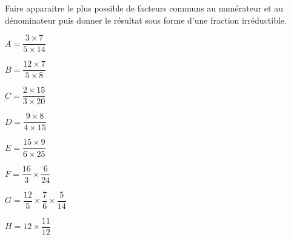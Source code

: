 \begin{exercice*}
    Faire apparaitre le plus possible de facteurs communs au numérateur et au dénominateur puis donner le résultat sous forme d'une fraction irréductible.

    \hspace*{-10mm}
    \begin{minipage}{\linewidth}
        \begin{multicols}{2}
            \begin{spacing}{2}
                \begin{list}{}{}
                    \item $A=\dfrac{3\times 7}{5\times 14}$
                    \item $B=\dfrac{12\times 7}{5\times 8}$
                    \item $C=\dfrac{2\times 15}{3\times 20}$
                    \item $D=\dfrac{9\times 8}{4\times 15}$
                    \item $E=\dfrac{15\times 9}{6\times 25}$
                    \item $F=\dfrac{16}{3}\times\dfrac{6}{24}$
                    \item $G=\dfrac{12}{5}\times\dfrac{7}{6}\times\dfrac{5}{14}$
                    \item $H=12\times\dfrac{11}{12}$
                \end{list}
            \end{spacing}
        \end{multicols}
    \end{minipage}
    
\end{exercice*}
